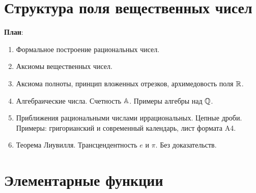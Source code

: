 

\section{Структура поля вещественных чисел}





\textbf{План}:
\begin{enumerate}
\item Формальное построение рациональных чисел.
\item Аксиомы вещественных чисел.
\item Аксиома полноты, принцип вложенных отрезков, архимедовость поля $\mathbb R$.
\item Алгебраические числа. Счетность $\mathbb A$. Примеры алгебры над $\mathbb Q$.
\item Приближения рациональными числами иррациональных. Цепные дроби. Примеры: григорианский и современный календарь, лист формата A4.
\item Теорема Лиувилля. Трансцендентность $e$ и $\pi$. Без доказательств.
\end{enumerate}


\section{Элементарные функции}
